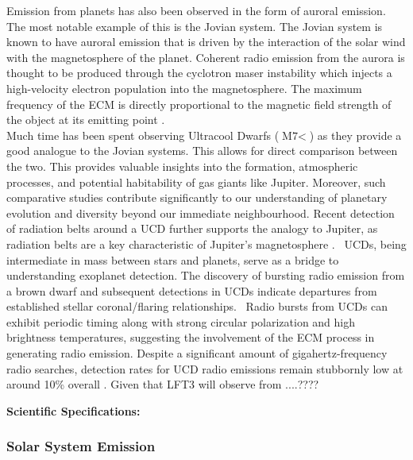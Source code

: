 Emission from planets has also been observed in the form of auroral emission. The most notable example of this is the Jovian system. The Jovian system is known to have auroral emission that is driven by the interaction of the solar wind with the magnetosphere of the planet. Coherent radio emission from the aurora is thought to be produced through the cyclotron maser instability \citep[ECM;][]{zarka_auroral_1998} which injects a high-velocity electron population into the magnetosphere. The maximum frequency of the ECM is directly proportional to the magnetic field strength of the object at its emitting point \citep{kavanagh_hunting_2023, joe_nature_review}.\\

Much time has been spent observing Ultracool Dwarfs ($\text{M7} <$) as they provide a good analogue to the Jovian systems. This allows for direct comparison between the two.  This provides valuable insights into the formation, atmospheric processes, and potential habitability of gas giants like Jupiter. Moreover, such comparative studies contribute significantly to our understanding of planetary evolution and diversity beyond our immediate neighbourhood. Recent detection of radiation belts around a UCD further supports the analogy to Jupiter, as radiation belts are a key characteristic of Jupiter's magnetosphere \citep{joe_nature_review}. \ UCDs, being intermediate in mass between stars and planets, serve as a bridge to understanding exoplanet detection. The discovery of bursting radio emission from a brown dwarf and subsequent detections in UCDs indicate departures from established stellar coronal/flaring relationships. \ Radio bursts from UCDs can exhibit periodic timing \citep{hallinan_rotational_2006} along with strong circular polarization and high brightness temperatures, suggesting the involvement of the ECM process in generating radio emission. Despite a significant amount of gigahertz-frequency radio searches, detection rates for UCD radio emissions remain stubbornly low at around 10\% overall \citep{lynch_radio_2016}. Given that LFT3 will observe from ....????

\textbf{Scientific Specifications:}

\subsubsection{Solar System Emission} 

